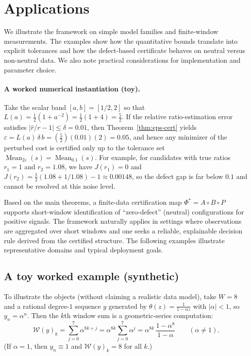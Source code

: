 \documentclass[11pt,reqno]{amsart}
\theoremstyle{definition}
\theoremstyle{remark}
\newcommand{\1}{\mathbf{1}}
\newcommand{\Mean}{\operatorname{Mean}}
\newcommand{\eps}{\varepsilon}
\begin{document}
\section{Applications}\label{sec:applications}

We illustrate the framework on simple model families and finite-window measurements. The examples show how the quantitative bounds translate into explicit tolerances and how the defect-based certificate behaves on neutral versus non-neutral data. We also note practical considerations for implementation and parameter choice.



\paragraph{A worked numerical instantiation (toy).} Take the scalar band $[a,b]=[1/2,2]$ so that $L(a)=\tfrac12(1+a^{-2})=\tfrac12(1+4)=\tfrac52$. If the relative ratio-estimation error satisfies $|\widehat r/r-1|\le \delta=0.01$, then Theorem~\ref{thm:eps-cert} yields $\eps=L(a)\,\delta\,b=(\tfrac52)(0.01)(2)=0.05$, and hence any minimizer of the perturbed cost is certified only up to the tolerance set $\Mean_{2\eps}(s)=\Mean_{0.1}(s)$. For example, for candidates with true ratios $r_1=1$ and $r_2=1.08$, we have $J(r_1)=0$ and $J(r_2)=\tfrac12(1.08+1/1.08)-1\approx 0.00148$, so the defect gap is far below $0.1$ and cannot be resolved at this noise level.


Based on the main theorems, a finite-data certification map $\Phi^\ast = A\circ B\circ P$
supports short-window identification of ``zero-defect'' (neutral) configurations for positive
signals. The framework naturally applies in settings where observations are aggregated over
short windows and one seeks a reliable, explainable decision rule derived from the certified
structure. The following examples illustrate representative domains and typical deployment
goals.

\subsection{A toy worked example (synthetic)}
To illustrate the objects (without claiming a realistic data model), take $W=8$ and a rational degree-$1$ sequence
$y$ generated by $\theta(z)=\frac{1}{1-\alpha z}$ with $|\alpha|<1$, so $y_n=\alpha^n$. Then the $k$th window sum is a geometric-series computation:
\[
\mathcal{W}(y)_k
=\sum_{j=0}^{7} \alpha^{8k+j}
=\alpha^{8k}\sum_{j=0}^{7}\alpha^{j}
=\alpha^{8k}\,\frac{1-\alpha^{8}}{1-\alpha}\qquad (\alpha\neq 1).
\]
(If $\alpha=1$, then $y_n\equiv 1$ and $\mathcal W(y)_k=8$ for all $k$.)
\end{document}
